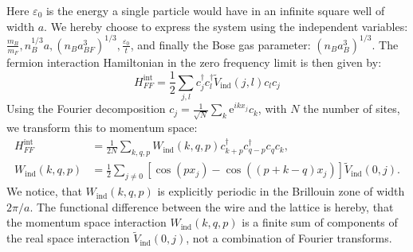 Here $\varepsilon_0$ is the energy a single particle would have in an infinite square well of width $a$. We hereby choose to express the system using the independent variables: $\frac{m_B}{m_F}, n_B^{1/3}a, \left(n_B a^3_{BF}\right)^{1 / 3}, \frac{\varepsilon_0}{t}$, and finally the Bose gas parameter: $\left(n_B a^3_{B}\right)^{1 / 3}$. The fermion interaction Hamiltonian in the zero frequency limit is then given by:
\begin{equation}
H^{\text{int}}_{FF} = \frac{1}{2}\sum_{j,l} c^\dagger_j c^\dagger_l \tilde{V}_{\text{ind}}(j, l) c_l c_j
\label{eq.Hintrealspace.lattice}
\end{equation}
Using the Fourier decomposition $c_j = \frac{1}{\sqrt{N}}\sum_k \text{e}^{ikx_j}c_k$, with $N$ the number of sites, we transform this to momentum space:
\begin{align}
H^{\text{int}}_{FF} &= \frac{1}{2N} \sum_{k, q, p} W_{\text{ind}}(k, q, p) c^\dagger_{k + p} c^\dagger_{q - p} c_q c_k, \nonumber \\  
W_{\text{ind}}(k, q, p) &= \frac{1}{2}\sum_{j\neq 0} \left[\cos(px_j) - \cos((p + k - q)x_j) \right]\tilde{V}_{\text{ind}}(0, j). 
\label{eq.Hintmomentumspace.lattice}
\end{align}
We notice, that $W_{\text{ind}}(k, q, p)$ is explicitly periodic in the Brillouin zone of width $2\pi / a$. The functional difference between the wire and the lattice is hereby, that the momentum space interaction $W_{\text{ind}}(k, q, p)$ is a finite sum of components of the real space interaction $\tilde{V}_{\text{ind}}(0, j)$, not a combination of Fourier transforms. 

